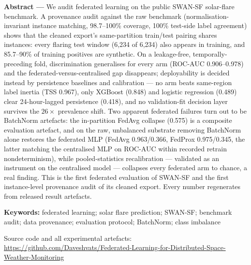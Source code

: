 \documentclass[11pt,a4paper]{article}
\begin{document}
\begin{center}
\begin{minipage}{0.92\textwidth}
\footnotesize
\textbf{Abstract ---}
We audit federated learning on the public SWAN-SF solar-flare
benchmark. A provenance audit against the raw benchmark
(normalisation-invariant instance matching, 98.7--100\% coverage,
100\% test-side label agreement) shows that the cleaned export's
same-partition train/test pairing shares instances: every flaring
test window (6{,}234 of 6{,}234) also appears in training, and
85.7--90\% of training positives are synthetic. On a leakage-free,
temporally-preceding fold, discrimination generalises for every arm
(ROC-AUC 0.906--0.978) and the federated-versus-centralised gap
disappears; deployability is decided instead by persistence
baselines and calibration --- no arm beats same-region label
inertia (TSS 0.967), only XGBoost (0.848) and logistic regression
(0.489) clear 24-hour-lagged persistence (0.418), and no
validation-fit decision layer survives the $26\times$ prevalence
shift. Two apparent federated failures turn out to be BatchNorm
artefacts: the in-partition FedAvg collapse (0.575) is a composite
evaluation artefact, and on the raw, unbalanced substrate removing
BatchNorm alone restores the federated MLP (FedAvg 0.963/0.366,
FedProx 0.975/0.345, the latter matching the centralised MLP on
ROC-AUC within recorded retrain nondeterminism), while
pooled-statistics recalibration --- validated as an instrument on
the centralised model --- collapses every federated arm to chance,
a real finding. This is the first federated evaluation of SWAN-SF
and the first instance-level provenance audit of its cleaned
export. Every number regenerates from released result artefacts.

\vspace{0.55em}
\noindent\textbf{Keywords:} federated learning; solar flare
prediction; SWAN-SF; benchmark audit; data provenance; evaluation
protocol; BatchNorm; class imbalance

\vspace{0.55em}
\noindent\footnotesize Source code and all experimental artefacts:
\url{https://github.com/Daveshvats/Federated-Learning-for-Distributed-Space-Weather-Monitoring}
\end{minipage}
\end{center}

\vspace{0.8em}









\FloatBarrier

\end{document}
